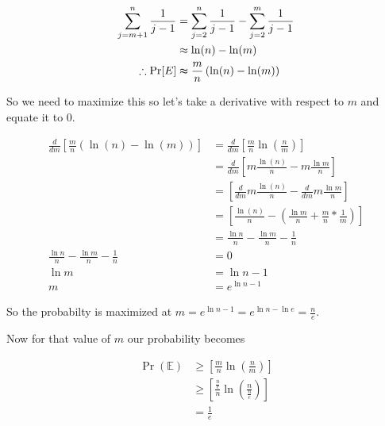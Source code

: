 \documentclass[addpoints,12pt]{exam}
\begin{document}
\begin{questions}
\begin{parts}
\begin{solution}
                \begin{align*}
                    \displaystyle\sum_{j = m+1} ^{n} \frac{1}{j-1} &= \displaystyle\sum_{j = 2} ^{n} \frac{1}{j-1} - \displaystyle\sum_{j = 2} ^{m} \frac{1}{j-1}\\
                    &\approx \ln(n) - \ln(m)\\
                    \therefore \Pr[E] &\thickapprox \frac{m}{n} \left(\ln(n) - \ln(m)\right)
                \end{align*}

                So we need to maximize this so let's take a derivative with respect to $m$ and equate it to $0$.

                \begin{align*}
                    \frac{d}{dm} \left[\frac{m}{n} \left(\ln(n) - \ln(m)\right)\right] &= \frac{d}{dm} \left[\frac{m}{n} \ln\left(\frac{n}{m}\right)\right]\\
                    &= \frac{d}{dm} \left[ m \frac{\ln(n)}{n} - m \frac{\ln m}{n}\right]\\
                    &= \left[ \frac{d}{dm} m \frac{\ln(n)}{n} - \frac{d}{dm} m \frac{\ln m}{n}\right]\\
                    &= \left[\frac{\ln(n)}{n} - \left(\frac{\ln m}{n} + \frac{m}{n} * \frac{1}{m}\right) \right]\\
                    &= \frac{\ln n}{n} - \frac{\ln m}{n} - \frac{1}{n}\\
                    \frac{\ln n}{n} - \frac{\ln m}{n} - \frac{1}{n} &= 0\\
                    \ln m &= \ln n - 1\\
                    m &= e^{\ln n - 1}
                \end{align*}

                So the probabilty is maximized at $m = e^{\ln n - 1} = e^{\ln n - \ln e} = \frac{n}{e}$.

                Now for that value of $m$ our probability becomes
                
                \begin{align*}
                    \Pr(\mathbb{E}) &\geq \left[\frac{m}{n} \ln\left(\frac{n}{m}\right)\right]\\
                    &\geq \left[\frac{\frac{n}{e}}{n} \ln\left(\frac{n}{\frac{n}{e}}\right)\right]\\
                    &= \frac{1}{e}
                \end{align*}
                

\end{solution}
\end{parts}
\end{questions}
\end{document}
